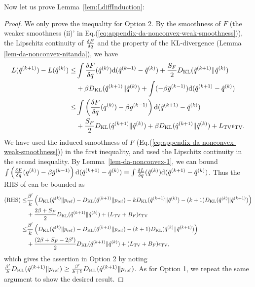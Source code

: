 Now let us prove Lemma~\ref{lem:LdiffInduction}:
\begin{proof}
    We only prove the inequality for Option 2.
    By the smoothness of $F$ (the weaker smoothness (ii)' in Eq.(\ref{eq:appendix-da-nonconvex-weak-smoothness})), the Lipschitz continuity of $\frac{\delta F}{\delta q}$ and the property of the KL-divergence (Lemma \ref{lem-da-nonconvex-nitanda}), we have 
    \begin{align}
        L(\hat{q}^{(k+1)}) - L(\hat{q}^{(k)})
        \leq& \int \frac{\delta F}{\delta q}(\hat{q}^{(k)})\mathrm{d}(\hat{q}^{(k+1)} - \hat{q}^{(k)}) + \frac{S_F}{2}D_{\mathrm{KL}}(\hat{q}^{(k+1)}\|\hat{q}^{(k)})\\
        & + \beta D_{\mathrm{KL}}(\hat{q}^{(k+1)} \| \hat{q}^{(k)}) + \int (- \beta  \bar{g}^{(k-1)}) \mathrm{d} (\hat{q}^{(k+1)} - \hat{q}^{(k)}) \\
        \leq & \int \left( \frac{\delta F}{\delta q}(q^{(k)}) - \beta \bar{g}^{(k-1)} \right)\mathrm{d}(\hat{q}^{(k+1)} - \hat{q}^{(k)}) \\
        & + \frac{S_F}{2}D_{\mathrm{KL}}(\hat{q}^{(k+1)}\|\hat{q}^{(k)}) + \beta D_{\mathrm{KL}}(\hat{q}^{(k+1)} \| \hat{q}^{(k)}) + 
        L_{\mathrm{TV}} \epsilon_{\mathrm{TV}}. \label{eq-da-nonconvex-monotone0}
    \end{align}
    We have used the induced smoothness of $F$ (Eq.(\ref{eq:appendix-da-nonconvex-weak-smoothness})) in the first inequality, and used the Lipschitz continuity in the second inequality.
    By Lemma~\ref{lem-da-nonconvex-1}, we can bound $\int \left( \frac{\delta F}{\delta q}(q^{(k)}) - \beta \bar{g}^{(k-1)} \right)\mathrm{d}(\hat{q}^{(k+1)} - \hat{q}^{(k)}) = \int \frac{\delta L}{\delta q}(\hat{q}^{(k)}) \mathrm{d}(\hat{q}^{(k+1)} - \hat{q}^{(k)})$.
    Thus the RHS of  can be bounded as 
    \begin{align}
        (\text{RHS})
        \leq& \frac{\beta'}{k}\left(D_{\mathrm{KL}}(\hat{q}^{(k)}\|p_{\rm{ref}})-D_{\mathrm{KL}}(\hat{q}^{(k+1)}\|p_{\rm{ref}})
        -kD_{\mathrm{KL}}(\hat{q}^{(k+1)}\|\hat{q}^{(k)})
        - (k+1)D_{\mathrm{KL}}(\hat{q}^{(k)} \| \hat{q}^{(k+1)})
        \right)\\
        &+ \frac{2\beta + S_F}{2}D_{\mathrm{KL}}(\hat{q}^{(k+1)}\|\hat{q}^{(k)})+ (L_{\mathrm{TV}} +B_F) \epsilon_{\mathrm{TV}} \\
        \leq& \frac{\beta'}{k}\left(D_{\mathrm{KL}}(\hat{q}^{(k)}\|p_{\rm{ref}})-D_{\mathrm{KL}}(\hat{q}^{(k+1)}\|p_{\rm{ref}}) - (k+1)D_{\mathrm{KL}}(\hat{q}^{(k)} \| \hat{q}^{(k+1)}) \right) \\
        &+ \frac{(2\beta + S_F - 2 \beta')}{2}D_{\mathrm{KL}}(\hat{q}^{(k+1)}\|\hat{q}^{(k)})+ (L_{\mathrm{TV}} +B_F) \epsilon_{\mathrm{TV}},
    \end{align}
    which gives the assertion in Option 2 by noting  $\frac{\beta'}{k}D_{\mathrm{KL}}(\hat{q}^{(k+1)}\|p_{\rm{ref}}) \geq \frac{\beta'}{k+1}D_{\mathrm{KL}}(\hat{q}^{(k+1)}\|p_{\rm{ref}})$. As for Option 1, we repeat the same argument to show the desired result.
\end{proof}

